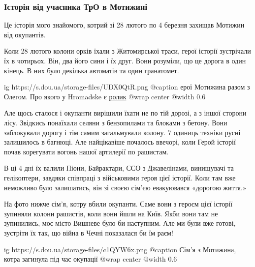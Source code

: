  
 
 
 
 

\subsubsection{Історія від учасника ТрО в Мотижині}
\label{sec:25_04_2022.stz.pc.ua.dou.1.geroizm_pogljad_kapellana.4.tro_motyzhyn}

Це історія мого знайомого, котрий зі 28 лютого по 4 березня захищав Мотижин від
окупантів.

Коли 28 лютого колони орків їхали з Житомирської траси, герої історії
зустрічали їх в чотирьох. Він, два його сини і їх друг. Вони розуміли, що це
дорога в один кінець. В них було декілька автоматів та один гранатомет.

\ifcmt
  ig https://s.dou.ua/storage-files/UDX0QtR.png
	@caption ерої Мотижина разом з Олегом. Про якого у Hromadske є \href{https://youtu.be/HPqmJA3MbU0}{ролик}
  @wrap center
  @width 0.6
\fi

Але щось сталося і окупанти вирішили їхати не по тій дорозі, а з іншої сторони
лісу. Звідкись понаїхали селяни з бензопилами та блоками з бетону. Вони
заблокували дорогу і тім самим загальмували колону. 7 одиниць техніки русні
залишилось в багнюці. Але найцікавіше почалось ввечорі, коли Герой історії
почав корегувати вогонь нашої артилерії по рашистам.

В ці 4 дні їх валили Піони, Байрактари, ССО з Джавелінами, винищувачі та
гелікоптери, завдяки співпраці з військовими героя цієї історії. Коли там вже
неможливо було залишатись, він зі своєю сім'єю евакуювався «дорогою життя.»

На фото нижче сім'я, котру вбили окупанти. Саме вони з героєм цієї історії
зупиняли колони рашистів, коли вони йшли на Київ. Якби вони там не зупинились,
моє місто Вишневе було би наступним. Але ми були вже готові, зустріти їх так,
що війна в Чечні показалася би їм раєм!

\ifcmt
  ig https://s.dou.ua/storage-files/c1QYW6x.png
	@caption Сім'я з Мотижина, котра загинула під час окупації
  @wrap center
  @width 0.6
\fi
